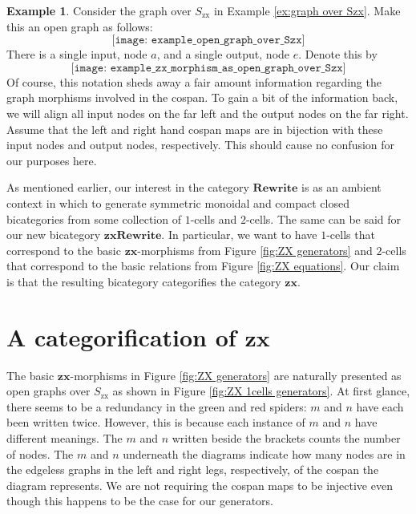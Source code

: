 \documentclass[11pt]{amsart}
\newcommand{\cat}[1]{\mathbf{#1}}
\theoremstyle{remark}
\theoremstyle{definition}
\newtheorem{ex}[thm]{Example}
\begin{document}
\begin{ex}
\label{ex:open graph over Szx}
Consider the graph over $S_{\text{zx}}$ in Example \eqref{ex:graph over Szx}.  Make this an open graph as follows:
\[
	\texttt{[image: example\_open\_graph\_over\_Szx]}
\]
There is a single input, node $a$, and a single output, node $e$. Denote this by
\[
\texttt{[image: example\_zx\_morphism\_as\_open\_graph\_over\_Szx]}
\]
Of course, this notation sheds away a fair amount information regarding the graph morphisms involved in the cospan. To gain a bit of the information back, we will align all input nodes on the far left and the output nodes on the far right. Assume that the left and right hand cospan maps are in bijection with these input nodes and output nodes, respectively. This should cause no confusion for our purposes here.
\end{ex}

As mentioned earlier, our interest in the category $\cat{Rewrite}$ is as an ambient context in which to generate symmetric monoidal and compact closed bicategories from some collection of $1$-cells and $2$-cells. The same can be said for our new bicategory $\cat{zxRewrite}$.  In particular, we want to have $1$-cells that correspond to the basic $\cat{zx}$-morphisms from Figure \ref{fig:ZX generators} and $2$-cells that correspond to the basic relations from Figure \ref{fig:ZX equations}.  Our claim is that the resulting bicategory categorifies the category $\cat{zx}$.

\section{A categorification of $\cat{zx}$}
\label{sec:zx categorified}

The basic $\cat{zx}$-morphisms in Figure \ref{fig:ZX generators} are naturally presented as open graphs over $S_{\text{zx}}$ as shown in Figure \ref{fig:ZX 1cells generators}.  At first glance, there seems to be a redundancy in the green and red spiders: $m$ and $n$ have each been written twice.  However, this is because each instance of $m$ and $n$ have different meanings.  The $m$ and $n$ written beside the brackets counts the number of nodes.  The $m$ and $n$ underneath the diagrams indicate how many nodes are in the edgeless graphs in the left and right legs, respectively, of the cospan the diagram represents.  We are not requiring the cospan maps to be injective even though this happens to be the case for our generators. 
\end{document}
